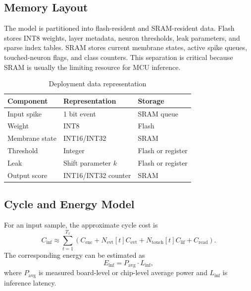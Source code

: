 \documentclass[journal]{IEEEtran}
\begin{document}
\subsection{Memory Layout}
The model is partitioned into flash-resident and SRAM-resident data. Flash stores INT8 weights, layer metadata, neuron thresholds, leak parameters, and sparse index tables. SRAM stores current membrane states, active spike queues, touched-neuron flags, and class counters. This separation is critical because SRAM is usually the limiting resource for MCU inference.

\begin{table}[t]
\centering
\caption{Deployment data representation}
\label{tab:data_representation}
\begin{tabular}{lll}
\toprule
Component & Representation & Storage \\
\midrule
Input spike & 1 bit event & SRAM queue \\
Weight & INT8 & Flash \\
Membrane state & INT16/INT32 & SRAM \\
Threshold & Integer & Flash or register \\
Leak & Shift parameter $k$ & Flash or register \\
Output score & INT16/INT32 counter & SRAM \\
\bottomrule
\end{tabular}
\end{table}

\subsection{Cycle and Energy Model}
For an input sample, the approximate cycle cost is
\begin{equation}
    C_{\mathrm{inf}} \approx \sum_{t=1}^{T_x} \left(C_{\mathrm{enc}} + N_{\mathrm{evt}}[t]C_{\mathrm{evt}} + N_{\mathrm{touch}}[t]C_{\mathrm{lif}} + C_{\mathrm{read}}\right).
\end{equation}
The corresponding energy can be estimated as
\begin{equation}
    E_{\mathrm{inf}} = P_{\mathrm{avg}} \cdot L_{\mathrm{inf}},
\end{equation}
where $P_{\mathrm{avg}}$ is measured board-level or chip-level average power and $L_{\mathrm{inf}}$ is inference latency.
\end{document}
